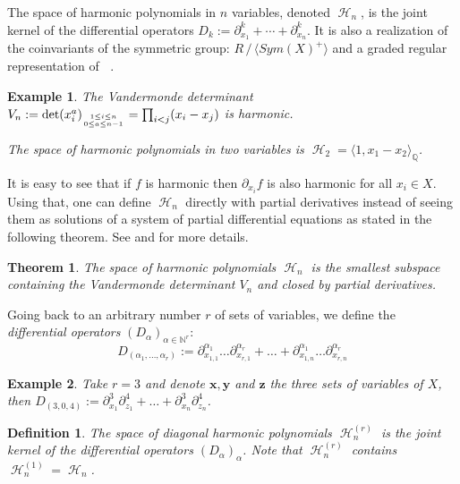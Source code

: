 \documentclass[letter,12pt]{article}
\newcommand{\NN}{\mathbb{N}}
\newcommand{\QQ}{\mathbb{Q}}
\DeclareMathOperator{\Sn}{\mathbb{S}_n}
\DeclareMathOperator{\harmonics}{\mathcal{H}}
\newtheorem{theorem}{Theorem}
\newtheorem{definition}{Definition}
\newtheorem{example}{Example}
\begin{document}
	The space of harmonic polynomials in $n$ variables, denoted $\harmonics_{n}$, is the joint kernel of the differential operators $D_k := \partial_{x_1}^k + \cdots + \partial_{x_n}^k$. It is also a realization of the coinvariants of the symmetric group: $R\, /\, \langle Sym(X)^+ \rangle$ and a graded regular representation of $\Sn$. 
	
	\begin{example}
		The Vandermonde determinant $V_n:= \det(x_i^a)_{1 \leq i \leq n \atop 0 \leq a \leq n-1} = \prod_{i<j}(x_i-x_j)$ is harmonic.
		
		The space of harmonic polynomials in two variables is $\harmonics_2 = \langle 1, x_1-x_2 \rangle_\QQ$. 
	\end{example}
		
	It is easy to see that if $f$ is harmonic then $\partial_{x_i} f$ is also harmonic for all $x_i \in X$. Using that, one can define $\harmonics_{n}$ directly with  partial derivatives instead of seeing them as solutions of a system of partial differential equations as stated in the following theorem. See \cite{Haiman2002} and \cite{Bergeron2009} for more details. 
	
	\begin{theorem}
		The space of harmonic polynomials $\harmonics_{n}$ is the smallest subspace containing the Vandermonde determinant $V_n$ and closed by partial derivatives.
	\end{theorem}
	
	Going back to an arbitrary number $r$ of sets of variables, we define the \emph{differential operators} $(D_\alpha)_{\alpha\in \NN^r}$:
	$$D_{(\alpha_1, \dots, \alpha_r)} := \partial_{x_{1,1}}^{\alpha_1}\dots\partial_{x_{r,1}}^{\alpha_r} + \dots + \partial_{x_{1,n}}^{\alpha_1}\dots\partial_{x_{r,n}}^{\alpha_r}$$
	
	\begin{example}
		Take $r=3$ and denote $\bm{x}, \bm{y}$ and $\bm{z}$ the three sets of variables of $X$, then $D_{(3,0,4)} := \partial_{x_1}^3\partial_{z_1}^4 + \dots + \partial_{x_n}^3\partial_{z_n}^4$. 
	\end{example}

	\begin{definition}
		The space of \emph{diagonal harmonic polynomials} $\harmonics_n^{(r)}$ is the joint kernel of the differential operators $(D_\alpha)_\alpha$. Note that $\harmonics_n^{(r)}$ contains $\harmonics_{n}^{(1)} = \harmonics_{n}$.
	\end{definition}
	
\end{document}
